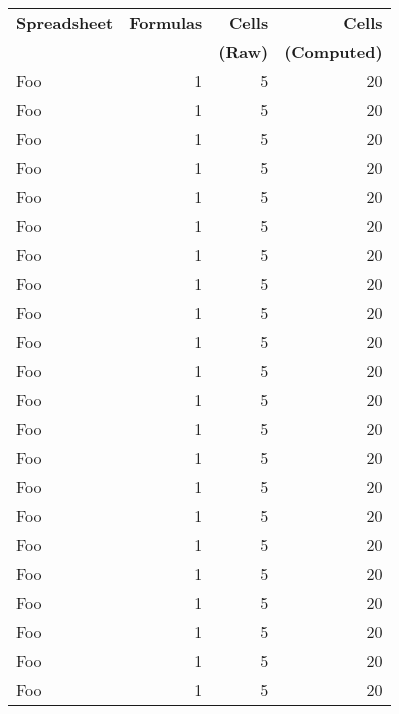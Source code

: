 \begin{table}[t!]
  \centering
    \begin{tabular}{l|rrr}
      \textsf{\bf{Spreadsheet}} & \textsf{\bf{Formulas}} & \textsf{\bf{Cells}} & \textsf{\bf{Cells}} \\
                                &                        & \textsf{\bf{(Raw)}} & \textsf{\bf{(Computed)}} \\
    \hline
    \textsf{Foo} & \textsf{1} & \textsf{5}  & \textsf{20} \\
    \textsf{Foo} & \textsf{1} & \textsf{5}  & \textsf{20} \\
    \textsf{Foo} & \textsf{1} & \textsf{5}  & \textsf{20} \\
    \textsf{Foo} & \textsf{1} & \textsf{5}  & \textsf{20} \\
    \textsf{Foo} & \textsf{1} & \textsf{5}  & \textsf{20} \\
    \textsf{Foo} & \textsf{1} & \textsf{5}  & \textsf{20} \\
    \textsf{Foo} & \textsf{1} & \textsf{5}  & \textsf{20} \\
    \textsf{Foo} & \textsf{1} & \textsf{5}  & \textsf{20} \\
    \textsf{Foo} & \textsf{1} & \textsf{5}  & \textsf{20} \\
    \textsf{Foo} & \textsf{1} & \textsf{5}  & \textsf{20} \\
    \textsf{Foo} & \textsf{1} & \textsf{5}  & \textsf{20} \\
    \textsf{Foo} & \textsf{1} & \textsf{5}  & \textsf{20} \\
    \textsf{Foo} & \textsf{1} & \textsf{5}  & \textsf{20} \\
    \textsf{Foo} & \textsf{1} & \textsf{5}  & \textsf{20} \\
    \textsf{Foo} & \textsf{1} & \textsf{5}  & \textsf{20} \\
    \textsf{Foo} & \textsf{1} & \textsf{5}  & \textsf{20} \\
    \textsf{Foo} & \textsf{1} & \textsf{5}  & \textsf{20} \\
    \textsf{Foo} & \textsf{1} & \textsf{5}  & \textsf{20} \\
    \textsf{Foo} & \textsf{1} & \textsf{5}  & \textsf{20} \\
    \textsf{Foo} & \textsf{1} & \textsf{5}  & \textsf{20} \\
    \textsf{Foo} & \textsf{1} & \textsf{5}  & \textsf{20} \\
    \textsf{Foo} & \textsf{1} & \textsf{5}  & \textsf{20} \\

\end{tabular}
\end{table}

